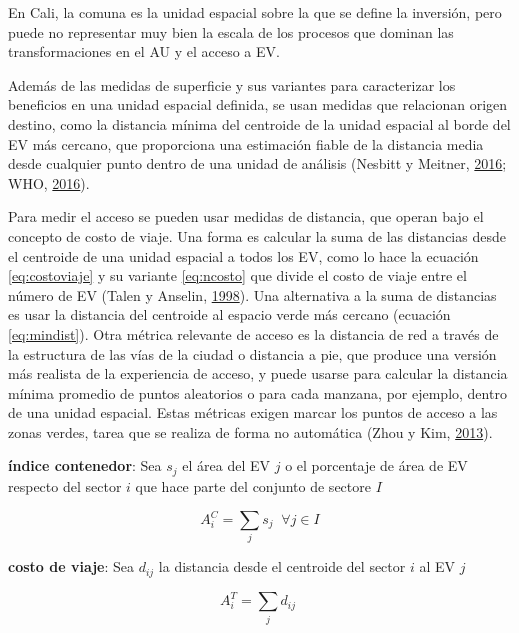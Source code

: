 \documentclass[12pt,a4paper,openany]{book}
\theoremstyle{definition}
\theoremstyle{definition}
\theoremstyle{definition}
\theoremstyle{remark}
\begin{document}
En Cali, la comuna es la unidad espacial sobre la que se define la
inversión, pero puede no representar muy bien la escala de los procesos
que dominan las transformaciones en el AU y el acceso a EV.

Además de las medidas de superficie y sus variantes para caracterizar
los beneficios en una unidad espacial definida, se usan medidas que
relacionan origen destino, como la distancia mínima del centroide de la
unidad espacial al borde del EV más cercano, que proporciona una
estimación fiable de la distancia media desde cualquier punto dentro de
una unidad de análisis (Nesbitt y Meitner,
\protect\hyperlink{ref-nesbitt_exploring_2016}{2016}; WHO,
\protect\hyperlink{ref-who2016urban}{2016}).

Para medir el acceso se pueden usar medidas de distancia, que operan
bajo el concepto de costo de viaje. Una forma es calcular la suma de las
distancias desde el centroide de una unidad espacial a todos los EV,
como lo hace la ecuación \eqref{eq:costoviaje} y su variante
\eqref{eq:ncosto} que divide el costo de viaje entre el número de EV
(Talen y Anselin, \protect\hyperlink{ref-talen_assessing_1998}{1998}).
Una alternativa a la suma de distancias es usar la distancia del
centroide al espacio verde más cercano (ecuación \eqref{eq:mindist}). Otra
métrica relevante de acceso es la distancia de red a través de la
estructura de las vías de la ciudad o distancia a pie, que produce una
versión más realista de la experiencia de acceso, y puede usarse para
calcular la distancia mínima promedio de puntos aleatorios o para cada
manzana, por ejemplo, dentro de una unidad espacial. Estas métricas
exigen marcar los puntos de acceso a las zonas verdes, tarea que se
realiza de forma no automática (Zhou y Kim,
\protect\hyperlink{ref-zhou_social_2013}{2013}).

\textbf{índice contenedor}: Sea \(s_j\) el área del EV \(j\) o el
porcentaje de área de EV respecto del sector \(i\) que hace parte del
conjunto de sectore \(I\)

\begin{equation}
A^{C}_i =\sum_j{s_j} \;  \; \forall  j \in I
\label{eq:contenedor}
\end{equation}

\textbf{costo de viaje}: Sea \(d_{ij}\) la distancia desde el centroide
del sector \(i\) al EV \(j\)

\begin{equation}
A^{T}_i =\sum_j{d_{ij}} \; 
\label{eq:costoviaje}
\end{equation}
\end{document}
